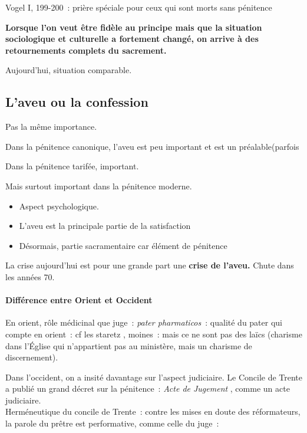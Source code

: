 Vogel I, 199-200~: prière spéciale pour ceux qui sont morts sans
pénitence

\textbf{Lorsque l'on veut être fidèle au principe mais que la situation
sociologique et culturelle a fortement changé, on arrive à des
retournements complets du sacrement.}

Aujourd'hui, situation comparable.

\hypertarget{laveu-ou-la-confession}{%
\subsection{L'aveu ou la confession}\label{laveu-ou-la-confession}}

Pas la même importance.

Dans la pénitence canonique, l'aveu est peu important et est un
préalable(parfois

Dans la pénitence tarifée, important.

Mais surtout important dans la pénitence moderne.

\begin{itemize}
\item
  Aspect psychologique.
\item
  L'aveu est la principale partie de la satisfaction
\item
  Désormais, partie sacramentaire car élément de pénitence
\end{itemize}

La crise aujourd'hui est pour une grande part une \textbf{crise de
l'aveu.} Chute dans les années 70.

\hypertarget{diffuxe9rence-entre-orient-et-occident}{%
\paragraph{Différence entre Orient et
Occident}\label{diffuxe9rence-entre-orient-et-occident}}

En orient, rôle médicinal que juge~: \emph{pater pharmaticos}~: qualité
du pater qui compte en orient~: cf les staretz , moines~: mais ce ne
sont pas des laïcs (charisme dans l'Église qui n'appartient pas au
ministère, mais un charisme de discernement).

Dans l'occident, on a insité davantage sur l'aspect judiciaire. Le
Concile de Trente a publié un grand décret sur la pénitence~: \emph{Acte
de Jugement} , comme un acte judiciaire.\\
Herméneutique du concile de Trente~: contre les mises en doute des
réformateurs, la parole du prêtre est performative, comme celle du
juge~:

